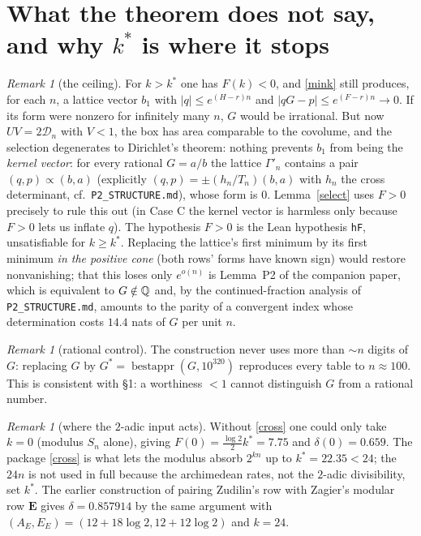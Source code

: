 \documentclass[11pt]{amsart}
\theoremstyle{remark}
\newtheorem{remark}[theorem]{Remark}
\newcommand{\cD}{\mathcal D}\newcommand{\cK}{\mathcal K}
\begin{document}
\section{What the theorem does not say, and why $k^*$ is where it stops}
\begin{remark}[the ceiling]
For $k>k^*$ one has $F(k)<0$, and \eqref{mink} still produces, for each $n$, a lattice vector $b_1$ with $|q|\le e^{(H-r)n}$ and $|qG-p|\le e^{(F-r)n}\to0$. If its form were nonzero for infinitely many $n$, $G$ would be irrational. But now $UV=2\cD_n$ with $V<1$, the box has area comparable to the covolume, and the selection degenerates to Dirichlet's theorem: nothing prevents $b_1$ from being the \emph{kernel vector}: for every rational $G=a/b$ the lattice $\Gamma'_n$ contains a pair $(q,p)\propto(b,a)$ (explicitly $(q,p)=\pm(h_n/T_n)(b,a)$ with $h_n$ the cross determinant, cf.\ \texttt{P2\_STRUCTURE.md}), whose form is $0$. Lemma~\ref{select} uses $F>0$ precisely to rule this out (in Case C the kernel vector is harmless only because $F>0$ lets us inflate $q$). The hypothesis $F>0$ is the Lean hypothesis \texttt{hF}, unsatisfiable for $k\ge k^*$. Replacing the lattice's first minimum by its first minimum \emph{in the positive cone} (both rows' forms have known sign) would restore nonvanishing; that this loses only $e^{o(n)}$ is Lemma~P2 of the companion paper, which is equivalent to $G\notin\mathbb Q$ and, by the continued-fraction analysis of \texttt{P2\_STRUCTURE.md}, amounts to the parity of a convergent index whose determination costs $14.4$ nats of $G$ per unit $n$.
\end{remark}
\begin{remark}[rational control]
The construction never uses more than $\sim n$ digits of $G$: replacing $G$ by $G^*=\operatorname{bestappr}(G,10^{320})$ reproduces every table to $n\approx100$. This is consistent with \S1: a worthiness $<1$ cannot distinguish $G$ from a rational number.
\end{remark}
\begin{remark}[where the $2$-adic input acts]
Without \eqref{cross} one could only take $k=0$ (modulus $S_n$ alone), giving $F(0)=\tfrac{\log2}2k^*=7.75$ and $\delta(0)=0.659$. The package \eqref{cross} is what lets the modulus absorb $2^{kn}$ up to $k^*=22.35<24$; the $24n$ is not used in full because the archimedean rates, not the $2$-adic divisibility, set $k^*$. The earlier construction of \cite{Lean} pairing Zudilin's row with Zagier's modular row $\mathbf E$ gives $\delta=0.857914$ by the same argument with $(A_E,E_E)=(12+18\log2,12+12\log2)$ and $k=24$.
\end{remark}
\end{document}
